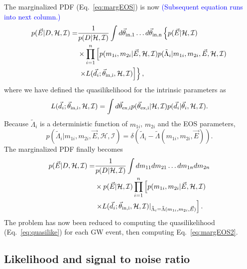 \documentclass[twocolumn,prd,amssymb,aps,nofootinbib,showpacs,epsf]{revtex4}
\newcommand\les[2]{\textcolor{blue}{{#1}\sout{#2}}}
\begin{document}
The marginalized PDF (Eq.~\eqref{eq:margEOS}) is now \les{(Subsequent equation runs into next column.)}{}
\begin{equation}
\begin{split}
p(\vec E | D,\mathcal{H},\mathcal{I}) = &\frac{1}{p(D | \mathcal{H},\mathcal{I})} 
\int d\vec\theta_{\rm in, 1} \dots d\vec\theta_{\rm in, n} \left\{ p(\vec E | \mathcal{H},\mathcal{I}) \right. \\
& \times \prod_{i=1}^n \left[p(m_{1i}, m_{2i} | \vec E, \mathcal{H},\mathcal{I}) p(\tilde\Lambda_i | m_{1i}, m_{2i}, \vec E, \mathcal{H},\mathcal{I}) \right.\\
& \left.\left. \times L(\vec d_i; \vec\theta_{\rm in, i}, \mathcal{H}, \mathcal{I}) \right]\right\},
\end{split}
\end{equation}
where we have defined the quasilikelihood for the intrinsic parameters as
\begin{equation}
\label{eq:quasilike}
L(\vec d_i; \vec\theta_{\rm in, i}, \mathcal{H}, \mathcal{I}) = \int d\vec\theta_{\rm ex, i} p(\vec\theta_{\rm ex, i} | \mathcal{H}, \mathcal{I}) p(\vec d_i | \vec\theta_i,\mathcal{H},\mathcal{I}).
\end{equation}
Because $\tilde\Lambda_i$ is a deterministic function of $m_{1i}$, $m_{2i}$ and the EOS parameters,
\begin{equation}
p(\tilde\Lambda_i | m_{1i}, m_{2i}, \vec E, \mathcal{H},\mathcal{I}) = \delta(\tilde\Lambda_i - \tilde\Lambda(m_{1i}, m_{2i}, \vec E)).
\end{equation}
The marginalized PDF finally becomes
\begin{equation}
\label{eq:margEOS2}
\begin{split}
p(\vec E | D,\mathcal{H},\mathcal{I}) =& \frac{1}{p(D | \mathcal{H},\mathcal{I})} \int dm_{11} dm_{21} \dots dm_{1n} dm_{2n} \\
&\times p(\vec E | \mathcal{H},\mathcal{I}) \prod_{i=1}^n \left[ p(m_{1i}, m_{2i} | \vec E, \mathcal{H},\mathcal{I}) \right.\\
& \left. \times L(\vec d_i; \vec\theta_{\rm in, i}, \mathcal{H}, \mathcal{I})|_{\tilde\Lambda_i = \tilde\Lambda(m_{1i}, m_{2i}, \vec E)} \right].
\end{split}
\end{equation}
The problem has now been reduced to computing the quasilikelihood (Eq.~\eqref{eq:quasilike}) for each GW event, then computing Eq.~\eqref{eq:margEOS2}.

\subsection{Likelihood and signal to noise ratio}
\end{document}
